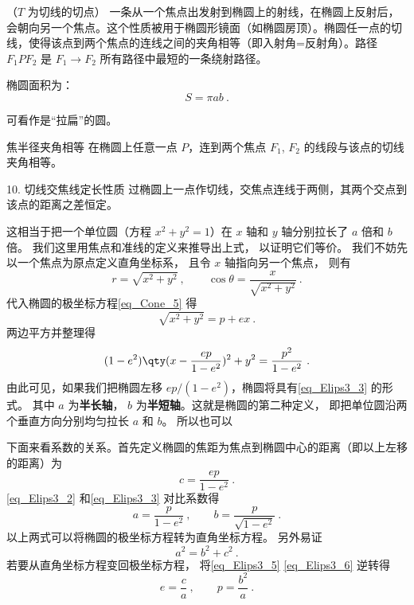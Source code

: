 （$T$ 为切线的切点）
一条从一个焦点出发射到椭圆上的射线，在椭圆上反射后，会朝向另一个焦点。这个性质被用于椭圆形镜面（如椭圆房顶）。椭圆任一点的切线，使得该点到两个焦点的连线之间的夹角相等（即入射角=反射角）。路径 $F_1PF_2$ 是 $F_1 \to F_2$ 所有路径中最短的一条绕射路径。

椭圆面积为：
\begin{equation}
S = \pi a b~.
\end{equation}

可看作是“拉扁”的圆。

焦半径夹角相等
在椭圆上任意一点 $P$，连到两个焦点 $F_1$, $F_2$ 的线段与该点的切线夹角相等。

	10.	切线交焦线定长性质
过椭圆上一点作切线，交焦点连线于两侧，其两个交点到该点的距离之差恒定。



这相当于把一个单位圆（方程 $x^2 + y^2 = 1$）在 $x$ 轴和 $y$ 轴分别拉长了 $a$ 倍和 $b$ 倍。 我们这里用焦点和准线的定义来推导出上式， 以证明它们等价。 我们不妨先以一个焦点为原点定义直角坐标系， 且令 $x$ 轴指向另一个焦点， 则有
\begin{equation}
r = \sqrt{x^2 + y^2}~, \qquad \cos\theta = \frac{x}{\sqrt{x^2 + y^2}}~.
\end{equation}
代入椭圆的极坐标方程\autoref{eq_Cone_5}  得
\begin{equation}
\sqrt{x^2 + y^2} = p + ex~.
\end{equation}
两边平方并整理得
\begin{equation}\label{eq_Elips3_2}
(1 - e^2) \qty( x - \frac{ep}{1 - e^2} )^2 + y^2 = \frac{p^2}{1 - e^2}~.
\end{equation}
由此可见，如果我们把椭圆左移 $ep/(1 - e^2)$，椭圆将具有\autoref{eq_Elips3_3} 的形式。 其中 $a$ 为\textbf{半长轴}， $b$ 为\textbf{半短轴}。这就是椭圆的第二种定义， 即把单位圆沿两个垂直方向分别均匀拉长 $a$ 和 $b$。 所以也可以

下面来看系数的关系。首先定义椭圆的焦距为焦点到椭圆中心的距离（即以上左移的距离）为
\begin{equation}\label{eq_Elips3_5}
c = \frac{ep}{1 - e^2}~.
\end{equation}
\autoref{eq_Elips3_2} 和\autoref{eq_Elips3_3} 对比系数得
\begin{equation}\label{eq_Elips3_6}
a = \frac{p}{1 - e^2}~, \qquad b = \frac{p}{\sqrt {1 - e^2} }~.
\end{equation}
以上两式可以将椭圆的极坐标方程转为直角坐标方程。 另外易证
\begin{equation}\label{eq_Elips3_7}
a^2 = b^2 + c^2~.
\end{equation}
若要从直角坐标方程变回极坐标方程， 将\autoref{eq_Elips3_5} \autoref{eq_Elips3_6} 逆转得
\begin{equation}\label{eq_Elips3_8}
e = \frac{c}{a}~,\qquad
p = \frac{b^2}{a}~.
\end{equation}


